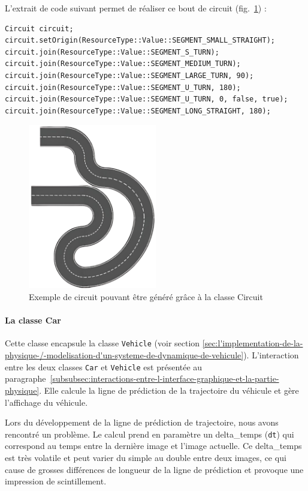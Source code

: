 L'extrait de code suivant permet de réaliser ce bout de circuit (fig.~\ref{fig:example_circuit_1}) :
\begin{lstlisting}[style=CStyle, label={lst:code_circuit}]
Circuit circuit;
circuit.setOrigin(ResourceType::Value::SEGMENT_SMALL_STRAIGHT);
circuit.join(ResourceType::Value::SEGMENT_S_TURN);
circuit.join(ResourceType::Value::SEGMENT_MEDIUM_TURN);
circuit.join(ResourceType::Value::SEGMENT_LARGE_TURN, 90);
circuit.join(ResourceType::Value::SEGMENT_U_TURN, 180);
circuit.join(ResourceType::Value::SEGMENT_U_TURN, 0, false, true);
circuit.join(ResourceType::Value::SEGMENT_LONG_STRAIGHT, 180);
\end{lstlisting}

\begin{figure}[h]
    \centering
    \includegraphics[width=0.5\textwidth]{resources/example_circuit_1}
    \caption{Exemple de circuit pouvant être généré grâce à la classe Circuit}
    \label{fig:example_circuit_1}
\end{figure}

\paragraph[Car]{La classe \textbf{Car}}
Cette classe encapsule la classe \texttt{Vehicle} (voir section \ref{sec:l'implementation-de-la-physique-/-modelisation-d'un-systeme-de-dynamique-de-vehicule}).
L'interaction entre les deux classes \texttt{Car} et \texttt{Vehicle} est présentée au paragraphe~\ref{subsubsec:interactions-entre-l-interface-graphique-et-la-partie-physique}.
Elle calcule la ligne de prédiction de la trajectoire du véhicule et gère l'affichage du véhicule.

Lors du développement de la ligne de prédiction de trajectoire, nous avons rencontré un problème.
Le calcul prend en paramètre un \gls{delta_temps} (\texttt{dt}) qui correspond au temps entre la dernière image et l'image actuelle.
Ce \gls{delta_temps} est très volatile et peut varier du simple au double entre deux images, ce qui cause de grosses différences de longueur de la ligne de prédiction et provoque une impression de scintillement.

